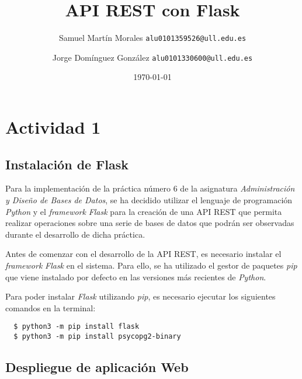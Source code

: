 \documentclass[11pt]{report}
\begin{document}

\title{API REST con Flask}
\author{Samuel Martín Morales  \texttt{alu0101359526@ull.edu.es} \and Jorge Domínguez González  \texttt{alu0101330600@ull.edu.es}}
\date{\today}

\maketitle

\tableofcontents

\chapter{Actividad 1}

\section{Instalación de Flask}

Para la implementación de la práctica número 6 de la asignatura \emph{Administración y Diseño de Bases de Datos}, se ha decidido utilizar el lenguaje de programación \emph{Python} y el \emph{framework} \emph{Flask} para la creación de una API REST que permita realizar operaciones sobre una serie de bases de datos que podrán ser observadas durante el desarrollo de dicha práctica.

Antes de comenzar con el desarrollo de la API REST, es necesario instalar el \emph{framework} \emph{Flask} en el sistema. Para ello, se ha utilizado el gestor de paquetes \emph{pip} que viene instalado por defecto en las versiones más recientes de \emph{Python}.

Para poder instalar \emph{Flask} utilizando \emph{pip}, es necesario ejecutar los siguientes comandos en la terminal:

\begin{verbatim}
  $ python3 -m pip install flask
  $ python3 -m pip install psycopg2-binary
\end{verbatim}


\section{Despliegue de aplicación Web}
\end{document}
